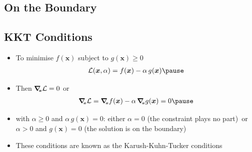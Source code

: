 \begin{slide}
\section[-2]{On the Boundary}
\pb
\pause{}
\begin{center}
  \pause
\end{center}
\end{slide}


\begin{slide}
\section[-1]{KKT Conditions}

\begin{PauseHighLight}
  \begin{itemize}\squeeze
  \item To minimise $f(\bm{x})$ subject to $g(\bm{x})\geq0$
    \begin{align*}
      \mathcal{L}(\bm{x},\alpha) =  f(\bm{x}) - \alpha\, g(\bm{x})\pause
    \end{align*}
  \item Then $\bm{\nabla}_{\!\!\scriptscriptstyle \bm{x}} \mathcal{L}=0$ or
    \begin{align*}
      \gradx \mathcal{L} = \gradx f(\bm{x}) - \alpha\,\gradx g(\bm{x}) =0\pause
    \end{align*}
  \item with $\alpha\geq0$ and $\alpha\, g(\bm{x})=0$: either $\alpha = 0$
    (the constraint plays no part)\pause\ or $\alpha>0$ and $g(\bm{x})=0$
    (the solution is on the boundary)\pause
  \item These conditions are known as the Karush-Kuhn-Tucker
    conditions\pause
  \end{itemize}
\end{PauseHighLight}

\end{slide}


